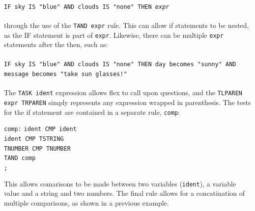 \documentclass[12pt]{report}
\begin{document}
\\
\texttt{IF sky IS "blue" AND clouds IS "none" THEN \textit{expr}}\\
\\
through the use of the \texttt{TAND expr} rule.  This can allow if statements to be nested, as the IF statement is part of \texttt{expr}. Likewise, there can be multiple \texttt{expr} statements after the then, such as:\\
\\
\texttt{IF sky IS "blue" AND clouds IS "none" THEN day becomes "sunny" AND message becomes "take sun glasses!"}\\
\\
The \texttt{TASK ident} expression allows flex to call upon questions, and the \texttt{TLPAREN expr TRPAREN} simply represents any expression wrapped in parenthesis.
The tests for the if statement are contained in a separate rule, \texttt{comp}:\\
\begin{tabbing}
\texttt{comp:} \= \texttt{ident CMP ident}\\
\> \texttt{\textbar \space ident CMP TSTRING}\\
\> \texttt{\textbar \space TNUMBER CMP TNUMBER}\\
\> \texttt{\textbar \space TAND comp}\\
\> \texttt{;}\\
\end{tabbing}
This allows comarisons to be made between two variables (\texttt{ident}), a variable value and a string and two numbers.  The final rule allows for a concatination of multiple comparisons, as shown in a previous example.
\end{document}
